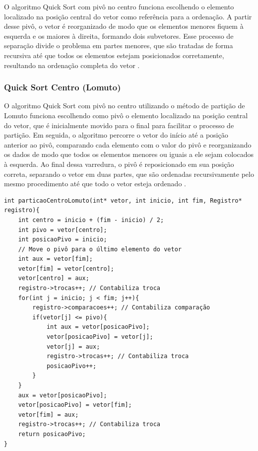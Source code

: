 \documentclass[12pt]{article}
\begin{document}
O algoritmo Quick Sort com pivô no centro funciona escolhendo o elemento localizado na posição central do vetor como referência para a ordenação. A partir desse pivô, o vetor é reorganizado de modo que os elementos menores fiquem à esquerda e os maiores à direita, formando dois subvetores. Esse processo de separação divide o problema em partes menores, que são tratadas de forma recursiva até que todos os elementos estejam posicionados corretamente, resultando na ordenação completa do vetor \cite{cormen2009}.

\subsubsection{Quick Sort Centro (Lomuto)}

O algoritmo Quick Sort com pivô no centro utilizando o método de partição de Lomuto funciona escolhendo como pivô o elemento localizado na posição central do vetor, que é inicialmente movido para o final para facilitar o processo de partição. Em seguida, o algoritmo percorre o vetor do início até a posição anterior ao pivô, comparando cada elemento com o valor do pivô e reorganizando os dados de modo que todos os elementos menores ou iguais a ele sejam colocados à esquerda. Ao final dessa varredura, o pivô é reposicionado em sua posição correta, separando o vetor em duas partes, que são ordenadas recursivamente pelo mesmo procedimento até que todo o vetor esteja ordenado \cite{sedgewick2011}.

\begin{lstlisting}
int particaoCentroLomuto(int* vetor, int inicio, int fim, Registro* registro){
    int centro = inicio + (fim - inicio) / 2;
    int pivo = vetor[centro];
    int posicaoPivo = inicio;
    // Move o pivô para o último elemento do vetor
    int aux = vetor[fim];
    vetor[fim] = vetor[centro];
    vetor[centro] = aux;
    registro->trocas++; // Contabiliza troca
    for(int j = inicio; j < fim; j++){	
        registro->comparacoes++; // Contabiliza comparação
        if(vetor[j] <= pivo){
            int aux = vetor[posicaoPivo];
            vetor[posicaoPivo] = vetor[j];
            vetor[j] = aux;
            registro->trocas++; // Contabiliza troca
            posicaoPivo++;
        }
    }
    aux = vetor[posicaoPivo];
    vetor[posicaoPivo] = vetor[fim];
    vetor[fim] = aux;
    registro->trocas++; // Contabiliza troca
    return posicaoPivo;
}
\end{lstlisting}
\end{document}
